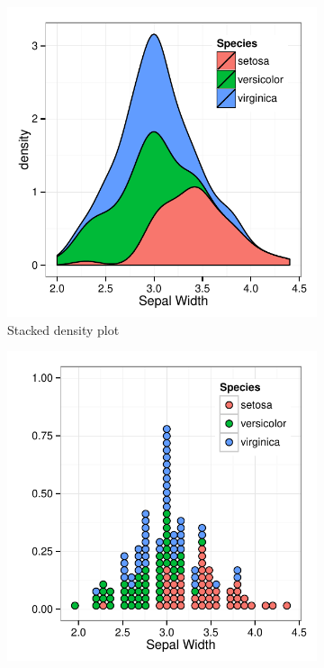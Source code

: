 \documentclass[11pt]{isuthesis}\usepackage[]{graphicx}\usepackage[]{color}
\begin{document}
\begin{figure}[htbp]\centering
\begin{subfigure}[b]{.33\linewidth}\centering
  \includegraphics[width=\linewidth]{fig-irisdatagrammar-1}
  \caption{Stacked density plot}
\end{subfigure}\hfill
\begin{subfigure}[b]{.33\linewidth}\centering
  \includegraphics[width=\linewidth]{fig-irisdatagrammar-2}

\end{subfigure}
\end{figure}
\end{document}
